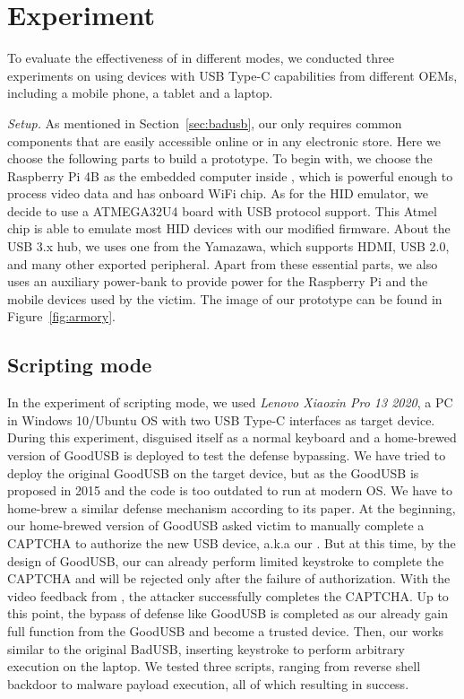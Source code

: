 \section{Experiment}
\label{sec:experiment}

To evaluate the effectiveness of \tool in different modes, we conducted three experiments on \tool using devices with USB Type-C capabilities from different OEMs, including a mobile phone, a tablet and a laptop.

\textit{Setup.} As mentioned in Section~\ref{sec:badusb}, our \tool only requires common components that are easily accessible online or in any electronic store. Here we choose the following parts to build a prototype. To begin with, we choose the Raspberry Pi 4B as the embedded computer inside \tool, which is powerful enough to process video data and has onboard WiFi chip. As for the HID emulator, we decide to use a ATMEGA32U4 board with USB protocol support. This Atmel chip is able to emulate most HID devices with our modified firmware. About the USB 3.x hub, we uses one from the Yamazawa, which supports HDMI, USB 2.0, and many other exported peripheral. Apart from these essential parts, we also uses an auxiliary power-bank to provide power for the Raspberry Pi and the mobile devices used by the victim. The image of our prototype \tool can be found in Figure~\ref{fig:armory}.

\subsection{Scripting mode}
In the experiment of scripting mode, we used \textit{Lenovo Xiaoxin Pro 13 2020}, a PC in Windows 10/Ubuntu OS with two USB Type-C interfaces as target device. 
During this experiment, \tool disguised itself as a normal keyboard and a home-brewed version of GoodUSB\cite{tian2015defending} is deployed to test the defense bypassing. We have tried to deploy the original GoodUSB on the target device, but as the GoodUSB is proposed in 2015 and the code is too outdated to run at modern OS. We have to home-brew a similar defense mechanism according to its paper.
At the beginning, our home-brewed version of GoodUSB asked victim to manually complete a CAPTCHA to  authorize the new USB device, a.k.a our \tool. But at this time, by the design of GoodUSB, our \tool can already perform limited keystroke to complete the CAPTCHA and will be rejected only after the failure of authorization. With the video feedback from \tool, the attacker successfully completes the CAPTCHA.
Up to this point, the bypass of defense like GoodUSB is completed as our \tool already gain full function from the GoodUSB and become a trusted device. Then, our \tool works similar to the original BadUSB, inserting keystroke to perform arbitrary execution on the laptop. We tested three scripts, ranging from reverse shell backdoor to malware payload execution, all of which resulting in success.

